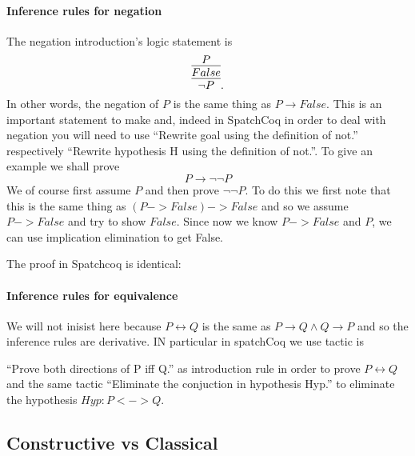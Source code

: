 \begin{itemize}
\paragraph{Inference rules for negation}
The negation introduction's logic statement is
$$\infer{\neg P}{\infer{False}{P}}.$$
In other words, the negation of $P$ is the same thing as $P\rightarrow False$. This is an important statement to make and, indeed in SpatchCoq in order to deal with negation you will need to use ``Rewrite goal using the definition of not.'' respectively ``Rewrite hypothesis	H using the definition of not.''. To give an example we shall prove 
$$P \rightarrow \neg \neg P$$
We of course first assume $P$ and then prove $\neg \neg P$. To do this we first note that this is the same thing as $(P->False)->False$ and so we assume $P->False$ and try to show $False$. Since now we know $P->False$ and $P$, we can use implication elimination to get False.




The proof in Spatchcoq is identical:


\end{itemize}

\paragraph{Inference rules for equivalence}

We will not inisist here because $P\leftrightarrow Q$ is the same as $P\rightarrow Q \land Q\rightarrow P$ and so the inference rules are derivative. IN particular
 in spatchCoq we use  tactic is
 
``Prove both directions of P iff Q.''  as introduction rule in order to prove $P\leftrightarrow Q$ and the same tactic ``Eliminate the conjuction in hypothesis Hyp.'' to eliminate the hypothesis $Hyp: P<->Q$.



 





\subsection{Constructive vs Classical}\label{subs:Constructive vs Classical}

